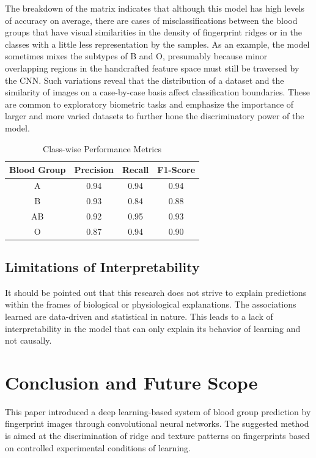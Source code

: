 \documentclass[conference]{IEEEtran}
\begin{document}
The breakdown of the matrix indicates that although this model has high levels of accuracy on average, there are cases of misclassifications between the blood groups that have visual similarities in the density of fingerprint ridges or in the classes with a little less representation by the samples. As an example, the model sometimes mixes the subtypes of B and O, presumably because minor overlapping regions in the handcrafted feature space must still be traversed by the CNN. Such variations reveal that the distribution of a dataset and the similarity of images on a case-by-case basis affect classification boundaries. These are common to exploratory biometric tasks and emphasize the importance of larger and more varied datasets to further hone the discriminatory power of the model.

\begin{table}[htbp]
\centering
\caption{Class-wise Performance Metrics}
\label{tab:class_metrics}
\renewcommand{\arraystretch}{1.2}
\setlength{\tabcolsep}{6pt}
\begin{tabular}{|c|c|c|c|}
\hline
\textbf{Blood Group} & \textbf{Precision} & \textbf{Recall} & \textbf{F1-Score} \\
\hline
A & 0.94 & 0.94 & 0.94 \\
B & 0.93 & 0.84 & 0.88 \\
AB & 0.92 & 0.95 & 0.93 \\
O & 0.87 & 0.94 & 0.90 \\
\hline
\end{tabular}
\end{table}

\subsection{Limitations of Interpretability}
It should be pointed out that this research does not strive to explain predictions within the frames of biological or physiological explanations. The associations learned are data-driven and statistical in nature. This leads to a lack of interpretability in the model that can only explain its behavior of learning and not causally.

\section{Conclusion and Future Scope}

This paper introduced a deep learning-based system of blood group prediction by fingerprint images through convolutional neural networks. The suggested method is aimed at the discrimination of ridge and texture patterns on fingerprints based on controlled experimental conditions of learning.
\end{document}
